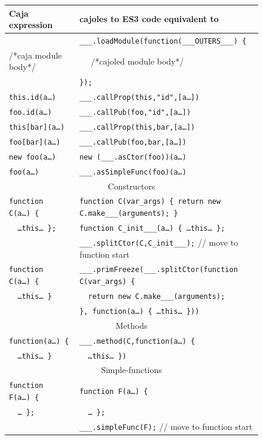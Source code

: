 \documentclass[letterpaper,twocolumn,10pt]{article}
\newcommand{\code}[1]{{\tt {#1}}}              %
\begin{document}
\begin{figure}
\begin{tabular}{ll}
  Caja expression & cajoles to ES3 code equivalent to\\ 
  \hline
                 & \code{\_\_\_.loadModule(function(\_\_\_OUTERS\_\_\_)\ \{}\\
  /*caja module body*/      
                 & \code{\ \ } /*cajoled module body*/ \\
                 & \code{\});} \\
  \hline
  \code{this.id(a\ldots)} 
                            & \code{\_\_\_.callProp(this,"id",[a\ldots])} \\
  \code{foo.id(a\ldots)}  
                            & \code{\_\_\_.callPub(foo,"id",[a\ldots])} \\
  \code{this[bar](a\ldots)} 
                            & \code{\_\_\_.callProp(this,bar,[a\ldots])} \\
  \code{foo[bar](a\ldots)}  
                            & \code{\_\_\_.callPub(foo,bar,[a\ldots])} \\
  \code{new foo(a\ldots)}   & \code{new (\_\_\_.asCtor(foo))(a\ldots)} \\
  \code{foo(a\ldots)}       & \code{\_\_\_.asSimpleFunc(foo)(a\ldots)} \\
  \hline
           \multicolumn{2}{c}{Constructors} \\
  \code{function C(a\ldots)\ \{}
  & \code{function C(var\_args)\ \{ return new C.make\_\_\_(arguments); \}} \\
  \code{\ \ {\ldots}this{\ldots}\ \};}
    & \code{function C\_init\_\_\_(a\ldots)\ \{ {\ldots}this{\ldots}\ \};} \\
    & \code{\_\_\_.splitCtor(C,C\_init\_\_\_);} // move to function start \\
    
  \code{function C(a\ldots)\ \{}
    & \code{\_\_\_.primFreeze(\_\_\_.splitCtor(function C(var\_args)\ \{}  \\
  \code{\ \ {\ldots}this{\ldots}\ \}}
    & \code{\ \ return new C.make\_\_\_(arguments);} \\
    & \code{\}, function(a\ldots)\ \{\ {\ldots}this{\ldots}\ \}))} \\
    
  \hline
           \multicolumn{2}{c}{Methods} \\
  \code{function(a\ldots)\ \{}
                 & \code{\_\_\_.method(C,function(a\ldots)\ \{} \\
  \code{\ \ {\ldots}this{\ldots}\ \}}
                 & \code{\ \ {\ldots}this{\ldots}\ \})}\\
  \hline
           \multicolumn{2}{c}{Simple-functions} \\
  \code{function F(a\ldots)\ \{}   & \code{function F(a\ldots)\ \{} \\
  \code{\ \ {\ldots}\ \};}         & \code{\ \ {\ldots}\ \};} \\
    & \code{\_\_\_.simpleFunc(F);} // move to function start \\
  

\end{tabular}
\end{figure}
\end{document}
